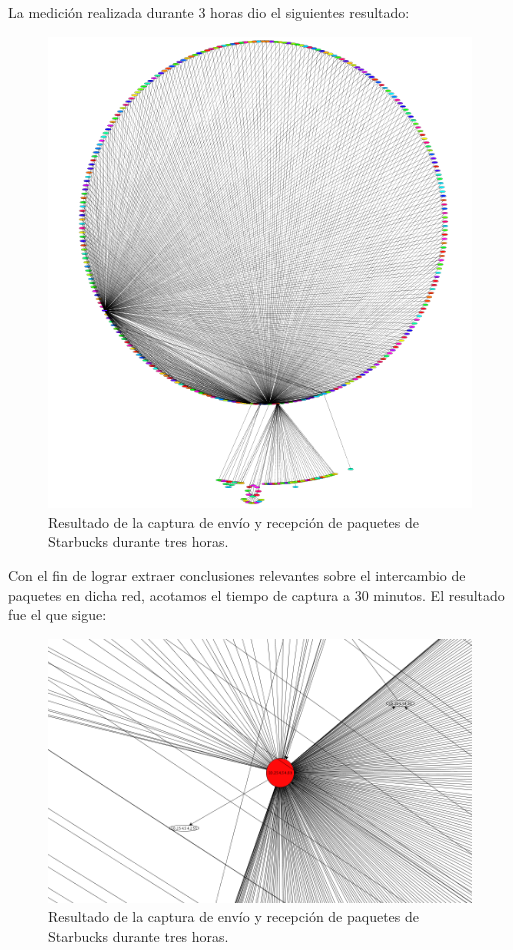 \documentclass[10pt, a4paper]{article}
\begin{document}
La medición realizada durante 3 horas dio el siguientes resultado:
\begin{figure}[H] %
\begin{center}
\includegraphics[width=400pt]{../imgs/starbucks_entero.png}
\caption{Resultado de la captura de envío y recepción de paquetes de Starbucks durante tres horas.}
\end{center}
\end{figure}

Con el fin de lograr extraer conclusiones relevantes sobre el intercambio de paquetes en dicha red, acotamos el tiempo de captura a 30 minutos. El resultado fue el que sigue:

\begin{figure}[H] %
\begin{center}
\includegraphics[width=400pt]{../imgs/starbucks30_1.png}
\caption{Resultado de la captura de envío y recepción de paquetes de Starbucks durante tres horas.}
\end{center}
\end{figure}
\end{document}
